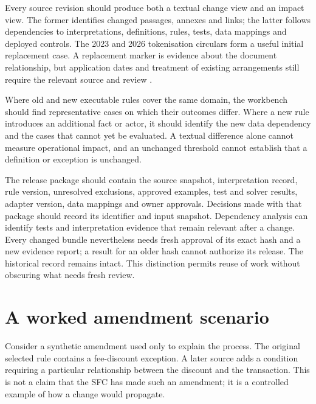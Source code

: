 Every source revision should produce both a textual change view and an impact
view. The former identifies changed passages, annexes and links; the latter
follows dependencies to interpretations, definitions, rules, tests, data mappings
and deployed controls. The 2023 and 2026 tokenisation circulars form a useful
initial replacement case. A replacement marker is evidence about the document
relationship, but application dates and treatment of existing arrangements still
require the relevant source and review \citep{sfctoken2023,sfctoken2026}.

Where old and new executable rules cover the same domain, the workbench should
find representative cases on which their outcomes differ. Where a new rule
introduces an additional fact or actor, it should identify the new data dependency
and the cases that cannot yet be evaluated. A textual difference alone cannot
measure operational impact, and an unchanged threshold cannot establish that a
definition or exception is unchanged.


The release package should contain the source snapshot, interpretation record,
rule version, unresolved exclusions, approved examples, test and solver results,
adapter version, data mappings and owner approvals. Decisions made with that
package should record its identifier and input snapshot. Dependency analysis can
identify tests and interpretation evidence that remain relevant after a change.
Every changed bundle nevertheless needs fresh approval of its exact hash and a
new evidence report; a result for an older hash cannot authorize its release.
The historical record remains intact. This distinction permits reuse of work
without obscuring what needs fresh review.

\section{A worked amendment scenario}
\label{merge:M10:05}


Consider a synthetic amendment used only to explain the process. The original
selected rule contains a fee-discount exception. A later source adds a condition
requiring a particular relationship between the discount and the transaction.
This is not a claim that the SFC has made such an amendment; it is a controlled
example of how a change would propagate.

